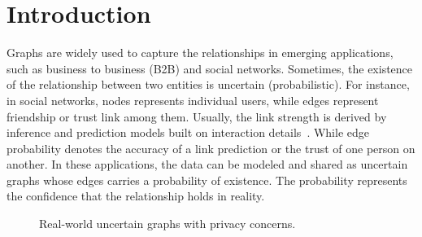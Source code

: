 \section{Introduction}

\label{sec:Intro}

Graphs are widely used to capture the relationships in emerging applications, such as business to business (B2B) and social networks. 
Sometimes, the existence of the relationship between two entities is uncertain (probabilistic). For instance, in social networks, nodes represents individual users, while edges represent friendship or trust link among them.  Usually, the link strength is derived by inference and prediction models built on interaction details~\cite{Adar_Managing_2007,Kempe_Maximizing_2003}. While edge probability denotes the accuracy of a link prediction or the trust of one person on another. 
In these applications, the data can be modeled and shared as uncertain graphs whose edges carries a probability of existence. The probability represents the confidence that the relationship holds in reality. 

\begin{figure}[!htb]
    \vspace{-6pt}
    \caption{Real-world uncertain graphs with privacy concerns.}
    \label{fig:motivation}
    \vspace{-10pt}
\end{figure} 

